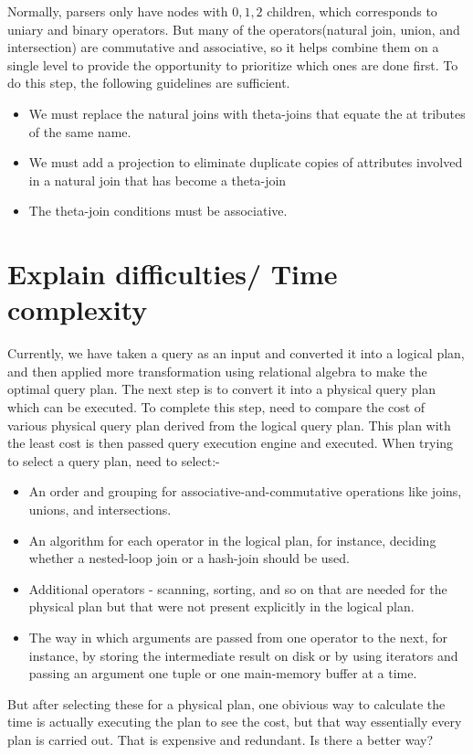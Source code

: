 \par Normally, parsers only have nodes with $0, 1, 2$ children, which corresponds to uniary and binary operators. But many of the operators(natural join, union, and intersection) are commutative and associative, so it helps combine them on a single level to provide the opportunity to prioritize which ones are done first. To do this step, the following guidelines are sufficient.
\begin{itemize}
    \item We must replace the natural joins with theta-joins that equate the at­ tributes of the same name.
    \item We must add a projection to eliminate duplicate copies of attributes in­volved in a natural join that has become a theta-join
    \item The theta-join conditions must be associative.
\end{itemize}


\section{Explain difficulties/ Time complexity}
Currently, we have taken a query as an input and converted it into a logical plan, and then applied more transformation using relational algebra to make the optimal query plan. The next step is to convert it into a physical query plan which can be executed. To complete this step, need to compare the cost of various physical query plan derived from the logical query plan. This plan with the least cost is then passed query execution engine and executed. When trying to select a query plan, need to select:-
\begin{itemize}
    \item An order and grouping for associative-and-commutative operations like
joins, unions, and intersections.
    \item An algorithm for each operator in the logical plan, for instance, deciding whether a nested-loop join or a hash-join should be used.
    \item Additional operators - scanning, sorting, and so on that are needed for the physical plan but that were not present explicitly in the logical plan.
    \item The way in which arguments are passed from one operator to the next, for instance, by storing the intermediate result on disk or by using iterators and passing an argument one tuple or one main-memory buffer at a time.
\end{itemize}
But after selecting these for a physical plan, one obivious way to calculate the time is actually executing the plan to see the cost, but that way essentially every plan is carried out. That is expensive and redundant. Is there a better way?

